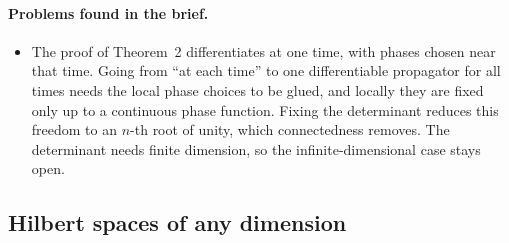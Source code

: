 \documentclass[11pt]{article}
\begin{document}
\paragraph{Problems found in the brief.}
\begin{itemize}
\item The proof of Theorem~2 differentiates at one time, with phases chosen near that time.
  Going from ``at each time'' to one differentiable propagator for all times needs the local
  phase choices to be glued, and locally they are fixed only up to a continuous phase function.
  Fixing the determinant reduces this freedom to an $n$-th root of unity, which connectedness
  removes. The determinant needs finite dimension, so the infinite-dimensional case stays open.
\end{itemize}

\subsection{Hilbert spaces of any dimension}\label{sec:unitary-entropy-any-dim}
\end{document}
